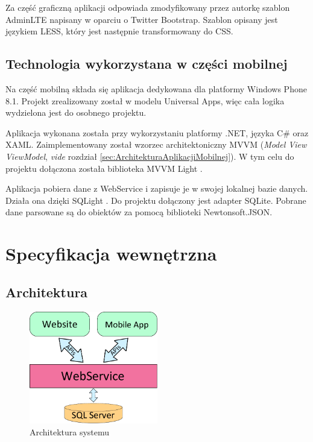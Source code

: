 \documentclass{book}
\begin{document}
		Za część graficzną aplikacji odpowiada zmodyfikowany przez autorkę szablon AdminLTE \cite{id:AdminLTE} napisany w oparciu o Twitter Bootstrap. Szablon opisany jest językiem LESS, który jest następnie transformowany do CSS.
		
		\section{Technologia wykorzystana w części mobilnej}
	
		Na część mobilną składa się aplikacja dedykowana dla platformy Windows Phone 8.1. Projekt zrealizowany został w modelu Universal Apps, więc cała logika wydzielona jest do osobnego projektu.
		
		Aplikacja wykonana została przy wykorzystaniu platformy .NET, języka C\# oraz XAML. Zaimplementowany został wzorzec architektoniczny MVVM (\emph{Model View ViewModel}, \emph{vide} rozdział \ref{sec:ArchitekturaAplikacjiMobilnej}). W tym celu do projektu dołączona została biblioteka MVVM Light \cite{id:MVVMLight}. 
		
		Aplikacja pobiera dane z WebService i zapisuje je w swojej lokalnej bazie danych. Działa ona dzięki SQLight \cite{id:SQLite}. Do projektu dołączony jest adapter SQLite. Pobrane dane parsowane są do obiektów za pomocą biblioteki Newtonsoft.JSON.

	\chapter{Specyfikacja wewnętrzna}
		\section{Architektura}
		
		\begin{figure}		
			\centering
			\includegraphics[width=0.5\textwidth]{images/architektura.pdf}
			\caption{Architektura systemu}
			\label{fig:architektura}
		\end{figure}
		
\end{document}
